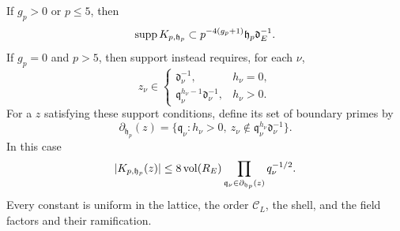 \begin{lemma}
If $g_p>0$ or $p\le5$, then
\begin{equation}\label{eq:fourier-inverse-support}
 \operatorname{supp} K_{p,\mathfrak h_p}
       \subset p^{-4(g_p+1)}\mathfrak h_p\mathfrak d_E^{-1}.
\end{equation}
If $g_p=0$ and $p>5$, then support instead requires, for each $\nu$,
\begin{equation}\label{eq:fourier-boundary-support}
 z_\nu\in
 \begin{cases}
 \mathfrak d_\nu^{-1},&h_\nu=0,\\
 \mathfrak q_\nu^{h_\nu-1}\mathfrak d_\nu^{-1},&h_\nu>0.
 \end{cases}
\end{equation}
For a $z$ satisfying these support conditions, define its set of boundary
primes by
\[
 \partial_{\mathfrak h_p}(z)
 =\{\mathfrak q_\nu:h_\nu>0,
       \ z_\nu\notin\mathfrak q_\nu^{h_\nu}\mathfrak d_\nu^{-1}\}.
\]
In this case
\begin{equation}\label{eq:fourier-boundary-decay}
 |K_{p,\mathfrak h_p}(z)|
 \le 8\operatorname{vol}(R_E)
       \prod_{\mathfrak q_\nu\in\partial_{\mathfrak h_p}(z)}q_\nu^{-1/2}.
\end{equation}
Every constant is uniform in the lattice, the order $\mathcal C_L$, the
shell, and the field factors and their ramification.
\end{lemma}

